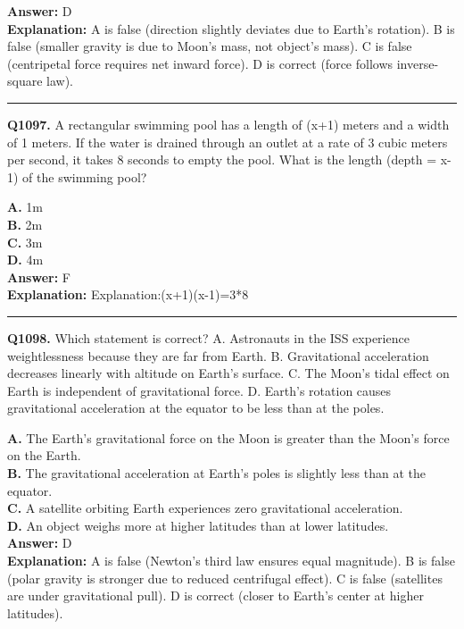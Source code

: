 \documentclass[12pt]{article}
\begin{document}
\textbf{Answer:} D \\
\textbf{Explanation:} A is false (direction slightly deviates due to Earth’s rotation). B is false (smaller gravity is due to Moon’s mass, not object’s mass). C is false (centripetal force requires net inward force). D is correct (force follows inverse-square law).

\hrule
\vspace{1em}


\noindent
\textbf{Q1097.} A rectangular swimming pool has a length of (x+1) meters and a width of 1 meters. If the water is drained through an outlet at a rate of 3 cubic meters per second, it takes 8 seconds to empty the pool. What is the length (depth = x-1) of the swimming pool?



\textbf{A.} 1m \\
\textbf{B.} 2m \\
\textbf{C.} 3m \\
\textbf{D.} 4m \\

\textbf{Answer:} F \\
\textbf{Explanation:} Explanation:(x+1)(x-1)=3*8

\hrule
\vspace{1em}


\noindent
\textbf{Q1098.} Which statement is correct?
A. Astronauts in the ISS experience weightlessness because they are far from Earth.
B. Gravitational acceleration decreases linearly with altitude on Earth’s surface.
C. The Moon’s tidal effect on Earth is independent of gravitational force.
D. Earth’s rotation causes gravitational acceleration at the equator to be less than at the poles.



\textbf{A.} The Earth’s gravitational force on the Moon is greater than the Moon’s force on the Earth. \\
\textbf{B.} The gravitational acceleration at Earth’s poles is slightly less than at the equator. \\
\textbf{C.} A satellite orbiting Earth experiences zero gravitational acceleration. \\
\textbf{D.} An object weighs more at higher latitudes than at lower latitudes. \\

\textbf{Answer:} D \\
\textbf{Explanation:} A is false (Newton’s third law ensures equal magnitude). B is false (polar gravity is stronger due to reduced centrifugal effect). C is false (satellites are under gravitational pull). D is correct (closer to Earth’s center at higher latitudes).
\end{document}

